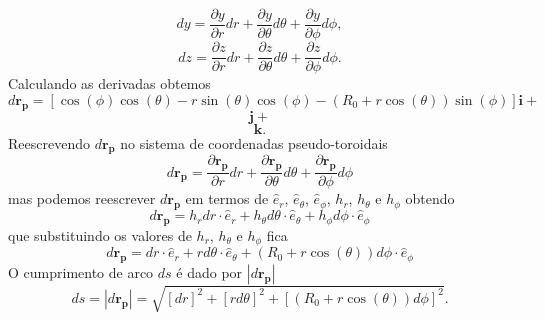 \documentclass[12pt,oneside,a4paper]{abntex2}
\begin{document}
\begin{equation}
dy = \dfrac{\partial y}{\partial r} dr + \dfrac{\partial y}{\partial \theta} d\theta + \dfrac{\partial y}{\partial \phi} d\phi,
\end{equation}
\begin{equation}
dz = \dfrac{\partial z}{\partial r} dr + \dfrac{\partial z}{\partial \theta} d\theta + \dfrac{\partial z}{\partial \phi} d\phi.
\end{equation}
Calculando as derivadas obtemos
\begin{equation}
d\bm{r_p} = [\cos(\phi) \cos(\theta) - r \sin(\theta) \cos(\phi) -(R_0 + r \cos(\theta))\sin(\phi) ]\bm{i} + 
\end{equation}
\begin{equation*}
[\sin(\phi) \cos(\theta) - r \sin(\theta) \sin(\phi) +(R_0 + r \cos(\theta))\cos(\phi) ]\bm{j} + 
\end{equation*}
\begin{equation*}
[-\sin(\theta)-r \cos(\theta)]\bm{k}.
\end{equation*}
Reescrevendo $d\bm{r_p}$ no sistema de coordenadas pseudo-toroidais
\begin{equation}
d\bm{r_p} = \dfrac{\partial \bm{r_p}}{\partial r} dr + \dfrac{\partial \bm{r_p}}{\partial \theta} d\theta + \dfrac{\partial \bm{r_p}}{\partial \phi} d\phi
\end{equation}
mas podemos reescrever $d\bm{r_p}$ em termos de $\hat{e}_r$, $\hat{e}_\theta$, $\hat{e}_\phi$, $h_r$, $h_\theta$ e $h_\phi$ obtendo
\begin{equation}
d\bm{r_p} = h_r dr \cdot \hat{e}_r+  h_\theta d\theta \cdot \hat{e}_\theta+h_\phi d\phi \cdot \hat{e}_\phi
\end{equation}
que substituindo os valores de $h_r$, $h_\theta$ e $h_\phi$ fica 
\begin{equation}
d\bm{r_p} = dr \cdot \hat{e}_r+  r d\theta \cdot \hat{e}_\theta+(R_0+r \cos(\theta)) d\phi \cdot \hat{e}_\phi
\end{equation}
O cumprimento de arco $ds$ é dado por $|d\bm{r_p}|$
\begin{equation}
ds=|d\bm{r_p}| = \sqrt{[dr]^2+  [r d\theta ]^2+[(R_0+r \cos(\theta)) d\phi ]^2}.
\end{equation}
\end{document}
